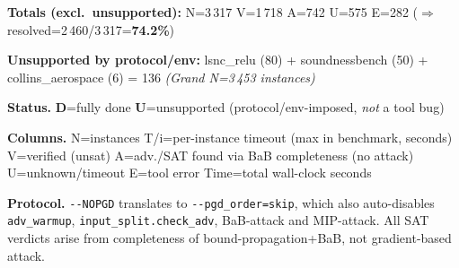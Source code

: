 \documentclass[10pt]{beamer}
\newcommand{\sdone}{{\color{cdone}\textbf{D}}}
\newcommand{\sunsup}{{\color{cunsup}\textbf{U}}}
\begin{document}
\begin{frame}[fragile]
\vspace{0.4em}
\centering\scriptsize
\textbf{Totals (excl.\ unsupported):} \quad N=3\,317 \quad V=1\,718 \quad A=742 \quad U=575 \quad E=282 \quad ($\Rightarrow$ resolved=2\,460/3\,317=\textbf{74.2\%})

\textbf{Unsupported by protocol/env:} lsnc\_relu (80) + soundnessbench (50) + collins\_aerospace (6) = 136 \quad \emph{(Grand N=3\,453 instances)}

\vspace{0.3em}
\centering\scriptsize
\textbf{Status.}\;
\sdone{}=fully done\quad
\sunsup{}=unsupported (protocol/env-imposed, \emph{not} a tool bug)

\vspace{0.2em}
\centering\scriptsize
\textbf{Columns.}\;
N=instances\quad
T/i=per-instance timeout (max in benchmark, seconds)\quad
V=verified (unsat)\quad
A=adv./SAT found via BaB completeness (no attack)\quad
U=unknown/timeout\quad
E=tool error\quad
Time=total wall-clock seconds

\vspace{0.2em}
\centering\scriptsize
\textbf{Protocol.}\;
\texttt{-{}-NOPGD} translates to \texttt{-{}-pgd\_order=skip}, which also auto-disables
\texttt{adv\_warmup}, \texttt{input\_split.check\_adv}, BaB-attack and MIP-attack. All SAT verdicts
arise from completeness of bound-propagation+BaB, not gradient-based attack.

\end{frame}
\end{document}
